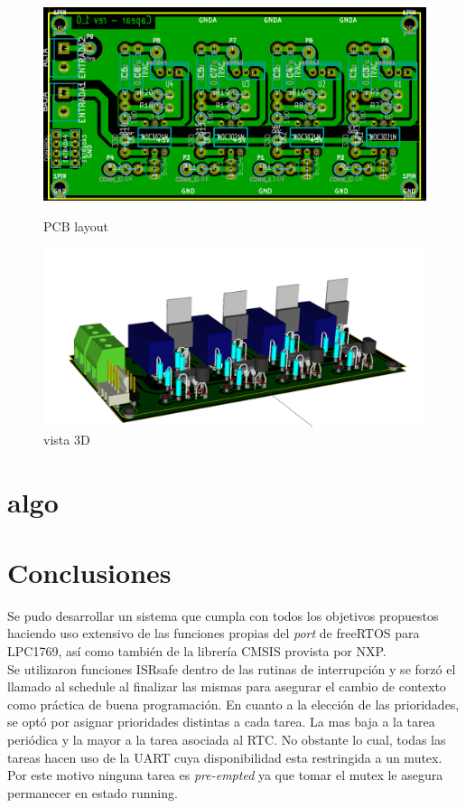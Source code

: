 \documentclass[a4paper,12pt]{article}
\begin{document}
\begin{figure}[ht]
	\begin{minipage}[b]{0.45\linewidth}
		\centering
		\includegraphics[width=\textwidth]{./imagenes/potencia-PCB.png}
		\caption{PCB layout}
		\label{fig:figure3}
	\end{minipage}
	\hspace{0.5cm}
	\begin{minipage}[b]{0.45\linewidth}
		\centering
		\includegraphics[width=\textwidth]{./imagenes/potencia-3D.png}
		\caption{vista 3D}
		\label{fig:figure4}
	\end{minipage}
\end{figure}


\section{algo}
\section{Conclusiones}
Se pudo desarrollar un sistema que cumpla con todos los objetivos propuestos haciendo uso extensivo de las funciones propias del {\textit{port}} de freeRTOS para LPC1769, así como también de la librería CMSIS provista por NXP.\\
Se utilizaron funciones ISRsafe dentro de las rutinas de interrupción y se forzó el llamado al schedule al finalizar las mismas para asegurar el cambio de contexto como práctica de buena programación.
En cuanto a la elección de las prioridades, se optó por asignar prioridades distintas a cada tarea. La mas baja a la tarea periódica y la mayor a la tarea asociada al RTC.  No obstante lo cual, todas las tareas hacen uso de la UART cuya disponibilidad esta restringida a un mutex.  Por este motivo ninguna tarea es {\textit{pre-empted}} ya que tomar el mutex le asegura permanecer en estado running.
\end{document}
